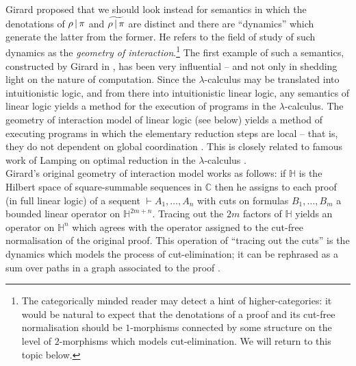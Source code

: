 \documentclass[english,letter paper,12pt,reqno]{article}
\theoremstyle{example}
\numberwithin{equation}{section}
\begin{document}
Girard proposed \cite{girard_towards} that we should look instead for semantics in which the denotations of $\rho \,|\, \pi$ and $\widetilde{\rho\,|\,\pi}$ are distinct and there are ``dynamics'' which generate the latter from the former. He refers to the field of study of such dynamics as the \emph{geometry of interaction}.\footnote{The categorically minded reader may detect a hint of higher-categories: it would be natural to expect that the denotations of a proof and its cut-free normalisation should be $1$-morphisms connected by some structure on the level of $2$-morphisms which models cut-elimination. We will return to this topic below.} The first example of such a semantics, constructed by Girard in \cite{girard_goi1}, has been very influential -- and not only in shedding light on the nature of computation. Since the $\lambda$-calculus may be translated into intuitionistic logic, and from there into intuitionistic linear logic, any semantics of linear logic yields a method for the execution of programs in the $\lambda$-calculus. The geometry of interaction model of linear logic (see below) yields a method of executing programs in which the elementary reduction steps are local -- that is, they do not dependent on global coordination \cite{danos_regnier1,danos_regnier2}. This is closely related to famous work of Lamping on optimal reduction in the $\lambda$-calculus \cite{Gonthier}.
\\

Girard's original geometry of interaction model \cite{girard_goi1} works as follows: if $\mathbb{H}$ is the Hilbert space of square-summable sequences in $\mathbb{C}$ then he assigns to each proof (in full linear logic) of a sequent $\vdash A_1,\ldots,A_n$ with cuts on formulas $B_1,\ldots,B_m$ a bounded linear operator on $\mathbb{H}^{2m+n}$. Tracing out the $2m$ factors of $\mathbb{H}$ yields an operator on $\mathbb{H}^n$ which agrees with the operator assigned to the cut-free normalisation of the original proof. This operation of ``tracing out the cuts'' is the dynamics which models the process of cut-elimination; it can be rephrased as a sum over paths in a graph associated to the proof \cite{danos_regnier2}.
\end{document}
